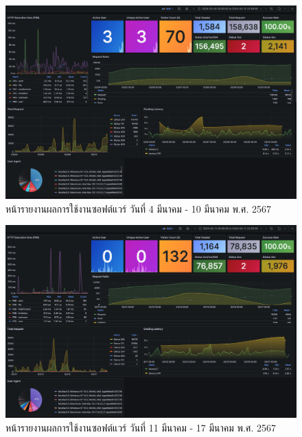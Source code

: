\documentclass[12pt,one side,openright,a4paper]{cpe-thesis-th}
\begin{document}
\begin{figure}[H]
  \centering
  \includegraphics[width=15cm]{figure/results/grafana/grafana-mar04-mar10.png}
  \caption[หน้ารายงานผลการใช้งานซอฟต์แวร์ วันที่ 4 มีนาคม - 10 มีนาคม พ.ศ. 2567]{หน้ารายงานผลการใช้งานซอฟต์แวร์ วันที่ 4 มีนาคม - 10 มีนาคม พ.ศ. 2567}
  \label{fig:res-grafana-m04m10}
\end{figure}

\begin{figure}[H]
  \centering
  \includegraphics[width=15cm]{figure/results/grafana/grafana-mar11-mar17.png}
  \caption[หน้ารายงานผลการใช้งานซอฟต์แวร์ วันที่ 11 มีนาคม - 17 มีนาคม พ.ศ. 2567]{หน้ารายงานผลการใช้งานซอฟต์แวร์ วันที่ 11 มีนาคม - 17 มีนาคม พ.ศ. 2567}
  \label{fig:res-grafana-m11m17}
\end{figure}
\end{document}

